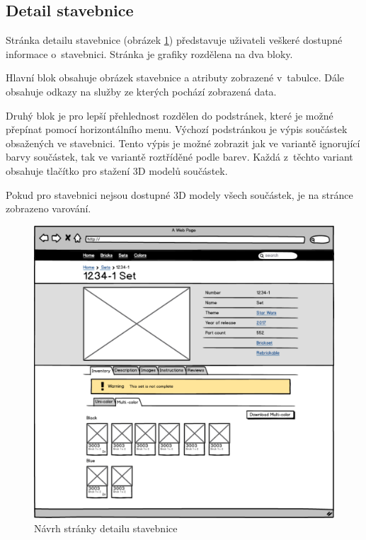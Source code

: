 \subsection{Detail stavebnice}
Stránka detailu stavebnice (obrázek \ref{wireframe-stavebnice-detail}) představuje uživateli veškeré dostupné informace o~stavebnici. Stránka je grafiky rozdělena na dva bloky. 

Hlavní blok obsahuje obrázek stavebnice a atributy zobrazené v~tabulce. Dále obsahuje odkazy na služby ze kterých pochází zobrazená data.

Druhý blok je pro lepší přehlednost rozdělen do podstránek, které je možné přepínat pomocí horizontálního menu. Výchozí podstránkou je výpis součástek obsažených ve stavebnici. Tento výpis je možné zobrazit jak ve variantě ignorující barvy součástek, tak ve variantě roztříděné podle barev. Každá z~těchto variant obsahuje tlačítko pro stažení 3D modelů součástek.

Pokud pro stavebnici nejsou dostupné 3D modely všech součástek, je na stránce zobrazeno varování. 

\begin{figure}[htbp]
    \centering
    \includegraphics[width=\textwidth,height=\textheight,keepaspectratio]{pdfs/wireframe_set.pdf}
    \caption{Návrh stránky detailu stavebnice}\label{wireframe-stavebnice-detail}
\end{figure}


